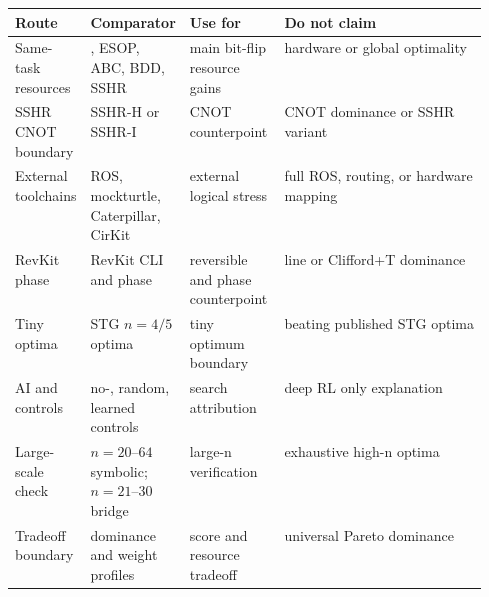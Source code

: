 \begin{tabularx}{\linewidth}{>{\raggedright\arraybackslash}p{0.15\linewidth}>{\raggedright\arraybackslash}p{0.20\linewidth}>{\raggedright\arraybackslash}p{0.20\linewidth}>{\raggedright\arraybackslash}X}
\toprule
Route & Comparator & Use for & Do not claim \\
\midrule
Same-task resources & \anf{}, ESOP, ABC, BDD, SSHR & main bit-flip resource gains & hardware or global optimality \\
SSHR CNOT boundary & SSHR-H or SSHR-I & CNOT counterpoint & CNOT dominance or SSHR variant \\
External toolchains & ROS, mockturtle, Caterpillar, CirKit & external logical stress & full ROS, routing, or hardware mapping \\
RevKit phase & RevKit CLI and phase \rz{} & reversible and phase counterpoint & line or Clifford+T dominance \\
Tiny optima & STG $n=4/5$ optima & tiny optimum boundary & beating published STG optima \\
AI and \mcts{} controls & no-\mcts{}, random, learned controls & search attribution & deep RL only explanation \\
Large-scale check & $n=20$--$64$ symbolic; $n=21$--$30$ bridge & large-n verification & exhaustive high-n optima \\
Tradeoff boundary & dominance and weight profiles & score and resource tradeoff & universal Pareto dominance \\
\bottomrule
\end{tabularx}
